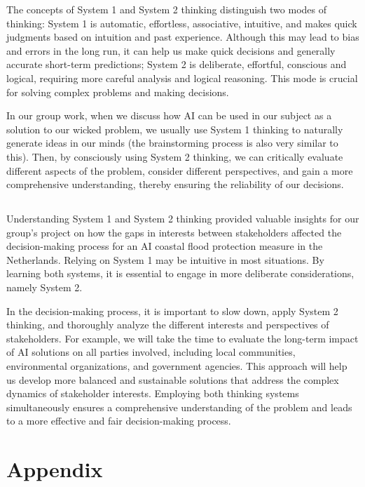 \documentclass[UTF8,a4paper,AutoFakeBold,AutoFakeSlant]{article}
\begin{document}
The concepts of System 1 and System 2 thinking distinguish two modes of thinking: System 1 is automatic, effortless, associative, intuitive, and makes quick judgments based on intuition and past experience. Although this may lead to bias and errors in the long run, it can help us make quick decisions and generally accurate short-term predictions; System 2 is deliberate, effortful, conscious and logical, requiring more careful analysis and logical reasoning. This mode is crucial for solving complex problems and making decisions.

In our group work, when we discuss how AI can be used in our subject as a solution to our wicked problem, we usually use System 1 thinking to naturally generate ideas in our minds (the brainstorming process is also very similar to this). Then, by consciously using System 2 thinking, we can critically evaluate different aspects of the problem, consider different perspectives, and gain a more comprehensive understanding, thereby ensuring the reliability of our decisions.

\subsection{}

Understanding System 1 and System 2 thinking provided valuable insights for our group’s project on how the gaps in interests between stakeholders affected the decision-making process for an AI coastal flood protection measure in the Netherlands. Relying on System 1 may be intuitive in most situations. By learning both systems, it is essential to engage in more deliberate considerations, namely System 2.

In the decision-making process, it is important to slow down, apply System 2 thinking, and thoroughly analyze the different interests and perspectives of stakeholders. For example, we will take the time to evaluate the long-term impact of AI solutions on all parties involved, including local communities, environmental organizations, and government agencies. This approach will help us develop more balanced and sustainable solutions that address the complex dynamics of stakeholder interests. Employing both thinking systems simultaneously ensures a comprehensive understanding of the problem and leads to a more effective and fair decision-making process.






\appendix
\section{Appendix}
\end{document}
